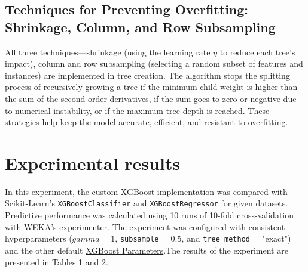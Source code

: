\documentclass{article}
\begin{document}
\subsection{Techniques for Preventing Overfitting: Shrinkage,             Column, and Row Subsampling}
All three techniques—shrinkage (using the learning rate $\eta$ to reduce each tree's impact), column and row subsampling (selecting a random subset of features and instances) are implemented in tree creation. The algorithm stops the splitting process of recursively growing a tree if the minimum child weight is higher than the sum of the second-order derivatives, if the sum goes to zero or negative due to numerical instability, or if the maximum tree depth is reached. These strategies help keep the model accurate, efficient, and resistant to overfitting.

\section{Experimental results}
In this experiment, the custom XGBoost implementation was compared with Scikit-Learn's \texttt{XGBoostClassifier} and \texttt{XGBoostRegressor} for given datasets. Predictive performance was calculated using 10 runs of 10-fold cross-validation with WEKA’s experimenter\cite{weka_book}. The experiment was configured with consistent hyperparameters (\(gamma = 1\), \texttt{subsample} = 0.5, and \texttt{tree\_method} = "exact") and the other default \href{https://xgboost.readthedocs.io/en/stable/parameter.html}{XGBoost Parameters}.The results of the experiment are presented in Tables 1 and 2.
\end{document}
